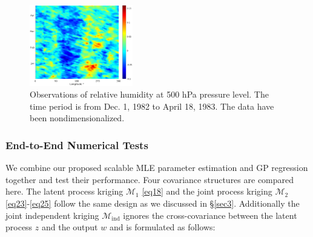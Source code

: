 \documentclass[article,ij4uq]{ij4uq}              %
\newcommand{\cm}[1]{{\color{red}Mihai:{#1}}}
\newcommand{\YC}[1]{\textcolor{blue}{[Yian:#1]}}
\begin{document}
\begin{figure}[!t]
  \centering
  \includegraphics[width=0.4\textwidth]{images/q_sample_1.eps}
  \caption{Observations of relative humidity at 500 hPa pressure level. The time period is from Dec. 1, 1982 to April 18, 1983. The data have been nondimensionalized.}\label{fig:4}
\end{figure}

\subsubsection{End-to-End Numerical Tests}
\par We combine our proposed scalable MLE parameter estimation and GP regression together and test their performance. 
Four  covariance structures are compared here. The latent process kriging $\mathcal{M}_{1}$ \eqref{eq18} and the joint process kriging $\mathcal{M}_{2}$ \eqref{eq23}-\eqref{eq25} follow the same design as we discussed in \S \ref{sec3}. Additionally the joint independent kriging $\mathcal{M}_{\mathrm{ind}}$ ignores the cross-covariance between the latent process $z$ and the output $w$ and is formulated as follows:
\end{document}
